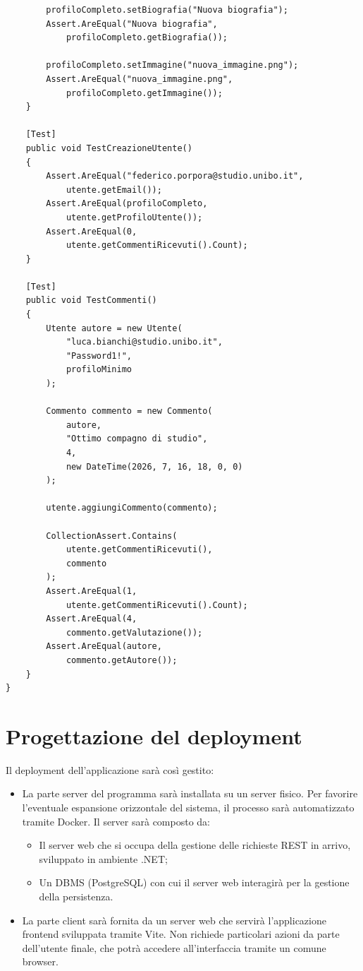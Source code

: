 \documentclass[12pt,a4paper]{report}
\begin{document}
\begin{lstlisting}
        profiloCompleto.setBiografia("Nuova biografia");
        Assert.AreEqual("Nuova biografia",
            profiloCompleto.getBiografia());

        profiloCompleto.setImmagine("nuova_immagine.png");
        Assert.AreEqual("nuova_immagine.png",
            profiloCompleto.getImmagine());
    }

    [Test]
    public void TestCreazioneUtente()
    {
        Assert.AreEqual("federico.porpora@studio.unibo.it",
            utente.getEmail());
        Assert.AreEqual(profiloCompleto,
            utente.getProfiloUtente());
        Assert.AreEqual(0,
            utente.getCommentiRicevuti().Count);
    }

    [Test]
    public void TestCommenti()
    {
        Utente autore = new Utente(
            "luca.bianchi@studio.unibo.it",
            "Password1!",
            profiloMinimo
        );

        Commento commento = new Commento(
            autore,
            "Ottimo compagno di studio",
            4,
            new DateTime(2026, 7, 16, 18, 0, 0)
        );

        utente.aggiungiCommento(commento);

        CollectionAssert.Contains(
            utente.getCommentiRicevuti(),
            commento
        );
        Assert.AreEqual(1,
            utente.getCommentiRicevuti().Count);
        Assert.AreEqual(4,
            commento.getValutazione());
        Assert.AreEqual(autore,
            commento.getAutore());
    }
}
\end{lstlisting}



\newpage
\section{Progettazione del deployment}
Il deployment dell'applicazione sarà così gestito:
\begin{itemize}[leftmargin=*]
    \item La parte server del programma sarà installata su un server fisico. Per favorire l'eventuale espansione orizzontale del sistema, il processo sarà automatizzato tramite Docker. Il server sarà composto da:
    \begin{itemize}[leftmargin=*]
        \item Il server web che si occupa della gestione delle richieste REST in arrivo, sviluppato in ambiente .NET;
        \item Un DBMS (PostgreSQL) con cui il server web interagirà per la gestione della persistenza.
    \end{itemize}
    \item La parte client sarà fornita da un server web che servirà l'applicazione frontend sviluppata tramite Vite. Non richiede particolari azioni da parte dell'utente finale, che potrà accedere all'interfaccia tramite un comune browser.
\end{itemize}
\end{document}
